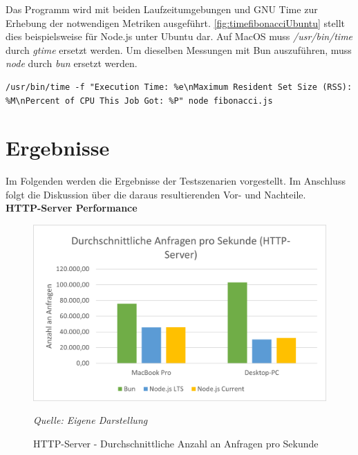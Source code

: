 \noindent
Das Programm wird mit beiden Laufzeitumgebungen und GNU Time zur Erhebung der notwendigen Metriken ausgeführt. \autoref{fig:timefibonacciUbuntu} stellt dies beispielsweise für Node.js unter Ubuntu dar. Auf MacOS muss \textit{/usr/bin/time} durch \textit{gtime} ersetzt werden. Um dieselben Messungen mit Bun auszuführen, muss \textit{node} durch \textit{bun} ersetzt werden.
\begin{lstlisting}[caption={[Messung der Fibonacci-Folge auf dem Desktop-PC]Messung der Fibonacci-Folge auf dem Desktop-PC\\\textit{Quelle: Eigene Darstellung}},label={fig:timefibonacciUbuntu}]
	/usr/bin/time -f "Execution Time: %e\nMaximum Resident Set Size (RSS): %M\nPercent of CPU This Job Got: %P" node fibonacci.js
\end{lstlisting}



\section{Ergebnisse} \label{sec:performance-results}
Im Folgenden werden die Ergebnisse der Testszenarien vorgestellt. Im Anschluss folgt die Diskussion über die daraus resultierenden Vor- und Nachteile.\\

\noindent
\textbf{HTTP-Server Performance}
\begin{figure}[h!]
	\centering
	\includegraphics[width=\linewidth]{./images/httpServerAverageRequestsPerSecond.png}
	\caption{HTTP-Server - Durchschnittliche Anzahl an Anfragen pro Sekunde}
	\label{fig:httpServerAverageRequestsPerSecond}
	\textit{Quelle: Eigene Darstellung}
\end{figure}


